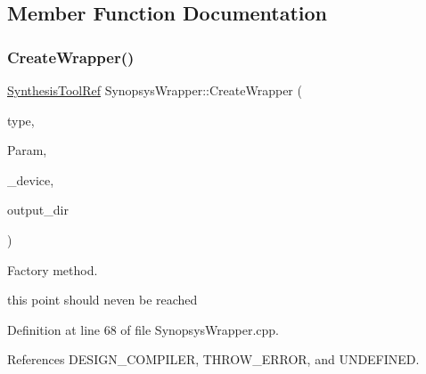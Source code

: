 \subsection{Member Function Documentation}
\mbox{\label{classSynopsysWrapper_a2d8acea1cdbd8bf8680dcb4d0fd22cb6}} 
\subsubsection{\texorpdfstring{Create\+Wrapper()}{CreateWrapper()}}
{\footnotesize\ttfamily \hyperlink{SynthesisTool_8hpp_af82cb8fc071612a27507a7c212097e58}{Synthesis\+Tool\+Ref} Synopsys\+Wrapper\+::\+Create\+Wrapper (\begin{DoxyParamCaption}\item[{\hyperlink{classSynopsysWrapper_aab689f1a6257beb3a60b6e3df4a718c6}{wrapper\+\_\+t}}]{type,  }\item[{const \hyperlink{Parameter_8hpp_a37841774a6fcb479b597fdf8955eb4ea}{Parameter\+Const\+Ref} \&}]{Param,  }\item[{const \hyperlink{target__device_8hpp_acedb2b7a617e27e6354a8049fee44eda}{target\+\_\+device\+Ref} \&}]{\+\_\+device,  }\item[{const std\+::string \&}]{output\+\_\+dir }\end{DoxyParamCaption})\hspace{0.3cm}{\ttfamily [static]}}



Factory method. 

this point should neven be reached 

Definition at line 68 of file Synopsys\+Wrapper.\+cpp.



References D\+E\+S\+I\+G\+N\+\_\+\+C\+O\+M\+P\+I\+L\+ER, T\+H\+R\+O\+W\+\_\+\+E\+R\+R\+OR, and U\+N\+D\+E\+F\+I\+N\+ED.

\mbox{\label{classSynopsysWrapper_a9f8b574d1d4e788b6e2bcde029a3d8fd}} 
